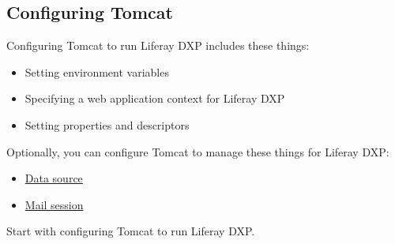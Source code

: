 \subsection{Configuring Tomcat}\label{configuring-tomcat}

Configuring Tomcat to run Liferay DXP includes these things:

\begin{itemize}
\tightlist
\item
  Setting environment variables
\item
  Specifying a web application context for Liferay DXP
\item
  Setting properties and descriptors
\end{itemize}

Optionally, you can configure Tomcat to manage these things for Liferay
DXP:

\begin{itemize}
\tightlist
\item
  \hyperref[database-configuration]{Data source}
\item
  \hyperref[mail-configuration]{Mail session}
\end{itemize}

Start with configuring Tomcat to run Liferay DXP.

